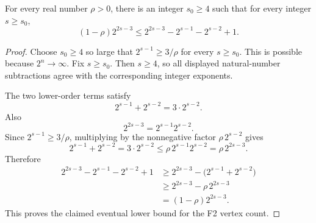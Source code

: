 \begin{helper}
For every real number \(\rho>0\), there is an integer \(s_0\ge4\) such that
for every integer \(s\ge s_0\),
\[
  (1-\rho)2^{2s-3}
  \le
  2^{2s-3}-2^{s-1}-2^{s-2}+1.
\]
\end{helper}
\begin{proof}
Choose \(s_0\ge4\) so large that \(2^{s-1}\ge 3/\rho\) for every
\(s\ge s_0\).  This is possible because \(2^n\to\infty\).  Fix
\(s\ge s_0\).  Then \(s\ge4\), so all displayed natural-number subtractions
agree with the corresponding integer exponents.

The two lower-order terms satisfy
\[
  2^{s-1}+2^{s-2}
  =3\cdot 2^{s-2}.
\]
Also
\[
  2^{2s-3}=2^{s-1}2^{s-2}.
\]
Since \(2^{s-1}\ge3/\rho\), multiplying by the nonnegative factor
\(\rho\,2^{s-2}\) gives
\[
  2^{s-1}+2^{s-2}
  =3\cdot2^{s-2}
  \le \rho\,2^{s-1}2^{s-2}
  =\rho\,2^{2s-3}.
\]
Therefore
\[
\begin{aligned}
  2^{2s-3}-2^{s-1}-2^{s-2}+1
  &\ge 2^{2s-3}-\bigl(2^{s-1}+2^{s-2}\bigr)\\
  &\ge 2^{2s-3}-\rho\,2^{2s-3}\\
  &=(1-\rho)2^{2s-3}.
\end{aligned}
\]
This proves the claimed eventual lower bound for the F2 vertex count.
\end{proof}
